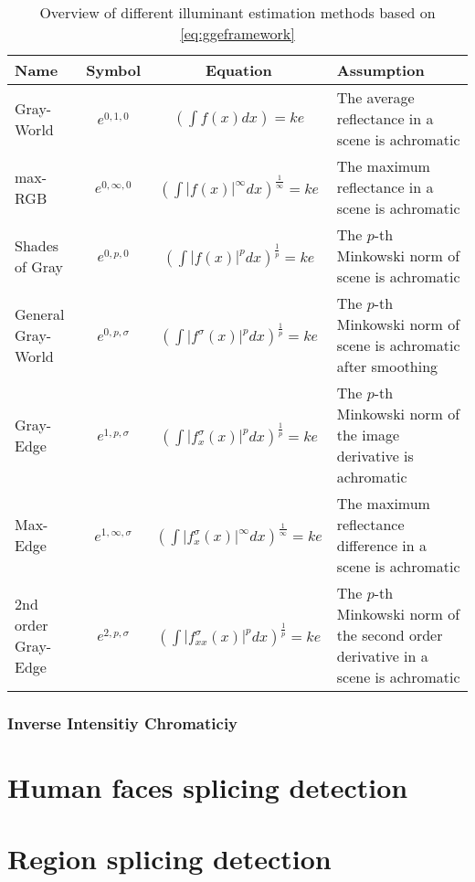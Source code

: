 \begin{scriptsize}


\begin{table}[ht]
\caption{Overview of different illuminant estimation methods based on \ref{eq:ggeframework}}
\centering
\begin{adjustbox}{width=1\textwidth}
\begin{tabular}{l c c l} 
\hline\hline 
Name & Symbol & Equation & Assumption \\ [0.5ex]
\hline 
Gray-World & $e^{0, 1, 0}$ & $(\int f(x) dx) = k e$ & The average reflectance in a scene is achromatic \\
max-RGB & $e^{0, \infty, 0}$ & $(\int |f(x)|^{\infty} dx)^{\frac{1}{\infty}} = k e$ & The maximum reflectance in a scene is achromatic \\
Shades of Gray & $e^{0, p, 0}$ & $(\int |f(x)|^{p} dx)^{\frac{1}{p}} = k e$ & The $p$-th Minkowski norm of scene is achromatic \\
General Gray-World & $e^{0, p, \sigma}$ & $(\int |f^{\sigma}(x)|^{p} dx)^{\frac{1}{p}} = k e$ & The $p$-th Minkowski norm of scene is achromatic after smoothing\\
Gray-Edge & $e^{1, p, \sigma}$ & $(\int |f^{\sigma}_{x}(x)|^{p} dx)^{\frac{1}{p}} = k e$ & The $p$-th Minkowski norm of the image derivative is achromatic\\
Max-Edge & $e^{1, \infty, \sigma}$ & $(\int |f^{\sigma}_{x}(x)|^{\infty} dx)^{\frac{1}{\infty}} = k e$ & The maximum reflectance difference in a scene is achromatic\\
2nd order Gray-Edge & $e^{2, p, \sigma}$ & $(\int |f^{\sigma}_{xx}(x)|^{p} dx)^{\frac{1}{p}} = k e$ & The $p$-th Minkowski norm of the second order derivative in a scene is achromatic\\ [1ex]
\hline
\end{tabular}
\end{adjustbox}
\label{table:ggemethods}
\end{table}

\end{scriptsize}


\subsubsection{Inverse Intensitiy Chromaticiy}


\section{Human faces splicing detection}

\section{Region splicing detection}